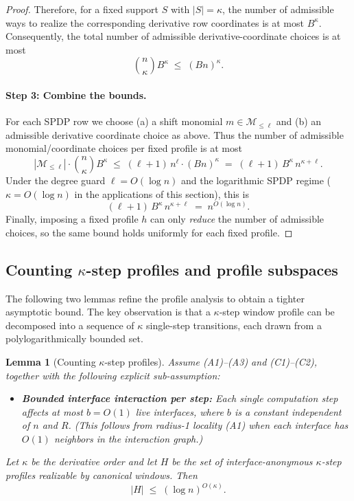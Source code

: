 \documentclass[12pt]{article}
\newtheorem{lemma}[theorem]{Lemma}
\theoremstyle{definition}
\theoremstyle{remark}
\begin{document}
\begin{proof}
Therefore, for a fixed support $S$ with $|S|=\kappa$, the number of admissible ways to
realize the corresponding derivative row coordinates is at most $B^{\kappa}$.
Consequently, the total number of admissible derivative-coordinate choices is at most
\[
\binom{n}{\kappa} B^{\kappa} \;\le\; (Bn)^{\kappa}.
\]

\paragraph{Step 3: Combine the bounds.}
For each SPDP row we choose (a) a shift monomial $m\in\mathcal{M}_{\le \ell}$ and
(b) an admissible derivative coordinate choice as above. Thus the number of
admissible monomial/coordinate choices per fixed profile is at most
\[
|\mathcal{M}_{\le \ell}| \cdot \binom{n}{\kappa}B^{\kappa}
\;\le\;
(\ell+1)\,n^{\ell}\cdot (Bn)^{\kappa}
\;=\;
(\ell+1)\,B^{\kappa}\,n^{\kappa+\ell}.
\]
Under the degree guard $\ell = O(\log n)$ and the logarithmic SPDP regime
($\kappa=O(\log n)$ in the applications of this section), this is
\[
(\ell+1)\,B^{\kappa}\,n^{\kappa+\ell}
\;=\;
n^{O(\log n)}.
\]
Finally, imposing a fixed profile $h$ can only \emph{reduce} the number of admissible
choices, so the same bound holds uniformly for each fixed profile.
\end{proof}

\subsection{Counting $\kappa$-step profiles and profile subspaces}
\label{subsec:kappa-step-profiles}

The following two lemmas refine the profile analysis to obtain a tighter asymptotic
bound. The key observation is that a $\kappa$-step window profile can be decomposed into
a sequence of $\kappa$ single-step transitions, each drawn from a polylogarithmically
bounded set.

\begin{lemma}[Counting $\kappa$-step profiles]
\label{lem:counting-kappa-step-profiles}
Assume (A1)--(A3) and (C1)--(C2), together with the following explicit sub-assumption:
\begin{itemize}
\item[(A1$'$)] \textbf{Bounded interface interaction per step:} Each single computation
step affects at most $b=O(1)$ live interfaces, where $b$ is a constant independent of
$n$ and $R$. (This follows from radius-1 locality (A1) when each interface has $O(1)$
neighbors in the interaction graph.)
\end{itemize}
Let $\kappa$ be the derivative order and let $H$ be the
set of interface-anonymous $\kappa$-step profiles realizable by canonical windows. Then
\[
|H| \;\le\; (\log n)^{O(\kappa)}.
\]
\end{lemma}
\end{document}
